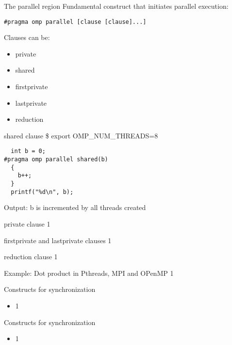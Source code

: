 \documentclass[14pt]{beamer}
\begin{document}
\begin{frame}[fragile]{The parallel region}
Fundamental construct that initiates parallel execution:
\begin{Verbatim}
#pragma omp parallel [clause [clause]...]
\end{Verbatim}
Clauses can be:
\begin{itemize}
\item private
\item shared
\item firstprivate
\item lastprivate
\item reduction
\end{itemize}
\end{frame}

\begin{frame}[fragile]{shared clause}
\$ export OMP\_NUM\_THREADS=8
\begin{Verbatim}
  int b = 0;
#pragma omp parallel shared(b)
  {
    b++;
  }
  printf("%d\n", b);
\end{Verbatim}
Output: b is incremented by all threads created
\end{frame}

\begin{frame}[fragile]{private clause}
1
\end{frame}

\begin{frame}[fragile]{firstprivate and lastprivate clauses}
1
\end{frame}

\begin{frame}[fragile]{reduction clause}
1
\end{frame}


\begin{frame}[fragile]{Example: Dot product in Pthreads, MPI and OPenMP}
1
\end{frame}

\begin{frame}{Constructs for synchronization}
\begin{itemize}
\item 1
\end{itemize}
\end{frame}

\begin{frame}{Constructs for synchronization}
\begin{itemize}
\item 1
\end{itemize}
\end{frame}
\end{document}
